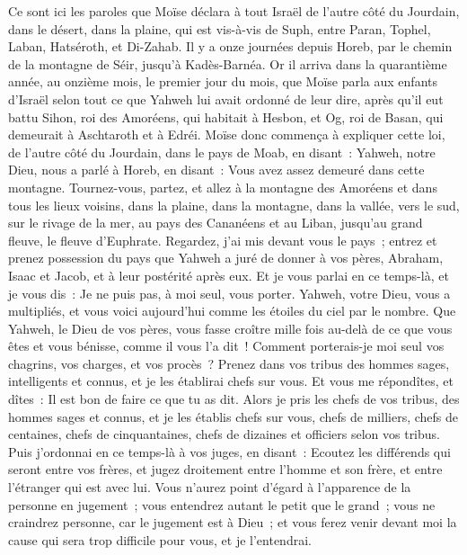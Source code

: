 \begin{multicols}{2}
\VerseOne{}Ce sont ici les paroles que Moïse déclara à tout Israël de l'autre côté du Jourdain, dans le désert, dans la plaine, qui est vis-à-vis de Suph, entre Paran, Tophel, Laban, Hatséroth, et Di-Zahab.
Il y a onze journées depuis Horeb, par le chemin de la montagne de Séir, jusqu'à Kadès-Barnéa.
Or il arriva dans la quarantième année, au onzième mois, le premier jour du mois, que Moïse parla aux enfants d'Israël selon tout ce que Yahweh lui avait ordonné de leur dire,
après qu'il eut battu Sihon, roi des Amoréens, qui habitait à Hesbon, et Og, roi de Basan, qui demeurait à Aschtaroth et à Edréi.
Moïse donc commença à expliquer cette loi, de l'autre côté du Jourdain, dans le pays de Moab, en disant~:
Yahweh, notre Dieu, nous a parlé à Horeb, en disant~: Vous avez assez demeuré dans cette montagne.
Tournez-vous, partez, et allez à la montagne des Amoréens et dans tous les lieux voisins, dans la plaine, dans la montagne, dans la vallée, vers le sud, sur le rivage de la mer, au pays des Cananéens et au Liban, jusqu'au grand fleuve, le fleuve d'Euphrate.
Regardez, j'ai mis devant vous le pays~; entrez et prenez possession du pays que Yahweh a juré de donner à vos pères, Abraham, Isaac et Jacob, et à leur postérité après eux.
Et je vous parlai en ce temps-là, et je vous dis~: Je ne puis pas, à moi seul, vous porter.
Yahweh, votre Dieu, vous a multipliés, et vous voici aujourd'hui comme les étoiles du ciel par le nombre.
Que Yahweh, le Dieu de vos pères, vous fasse croître mille fois au-delà de ce que vous êtes et vous bénisse, comme il vous l'a dit~!
Comment porterais-je moi seul vos chagrins, vos charges, et vos procès~?
Prenez dans vos tribus des hommes sages, intelligents et connus, et je les établirai chefs sur vous.
Et vous me répondîtes, et dîtes~: Il est bon de faire ce que tu as dit.
Alors je pris les chefs de vos tribus, des hommes sages et connus, et je les établis chefs sur vous, chefs de milliers, chefs de centaines, chefs de cinquantaines, chefs de dizaines et officiers selon vos tribus.
Puis j'ordonnai en ce temps-là à vos juges, en disant~: Ecoutez les différends qui seront entre vos frères, et jugez droitement entre l'homme et son frère, et entre l'étranger qui est avec lui.
Vous n'aurez point d'égard à l'apparence de la personne en jugement~; vous entendrez autant le petit que le grand~; vous ne craindrez personne, car le jugement est à Dieu~; et vous ferez venir devant moi la cause qui sera trop difficile pour vous, et je l'entendrai.

\end{multicols}
